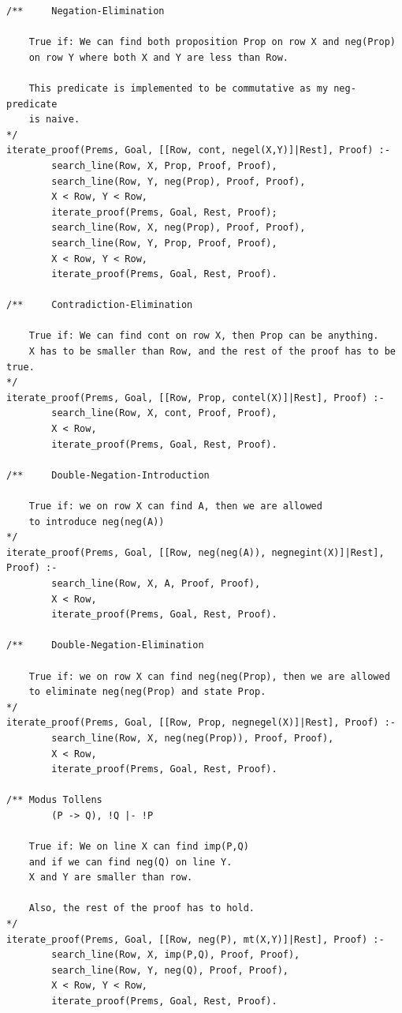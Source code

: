 \documentclass[a4paper]{article}
\begin{document}
\begin{verbatim}
/**     Negation-Elimination

	True if: We can find both proposition Prop on row X and neg(Prop)
	on row Y where both X and Y are less than Row.
	
	This predicate is implemented to be commutative as my neg-predicate
	is naive.
*/
iterate_proof(Prems, Goal, [[Row, cont, negel(X,Y)]|Rest], Proof) :-
        search_line(Row, X, Prop, Proof, Proof),
        search_line(Row, Y, neg(Prop), Proof, Proof),
        X < Row, Y < Row,
        iterate_proof(Prems, Goal, Rest, Proof);
        search_line(Row, X, neg(Prop), Proof, Proof),
        search_line(Row, Y, Prop, Proof, Proof),
        X < Row, Y < Row,
        iterate_proof(Prems, Goal, Rest, Proof).

/**     Contradiction-Elimination

	True if: We can find cont on row X, then Prop can be anything.
	X has to be smaller than Row, and the rest of the proof has to be true.
*/
iterate_proof(Prems, Goal, [[Row, Prop, contel(X)]|Rest], Proof) :-
        search_line(Row, X, cont, Proof, Proof),
        X < Row,
        iterate_proof(Prems, Goal, Rest, Proof).

/**     Double-Negation-Introduction

	True if: we on row X can find A, then we are allowed 
	to introduce neg(neg(A))
*/
iterate_proof(Prems, Goal, [[Row, neg(neg(A)), negnegint(X)]|Rest], Proof) :-
        search_line(Row, X, A, Proof, Proof),
        X < Row,
        iterate_proof(Prems, Goal, Rest, Proof).

/**     Double-Negation-Elimination

	True if: we on row X can find neg(neg(Prop), then we are allowed
	to eliminate neg(neg(Prop) and state Prop.
*/
iterate_proof(Prems, Goal, [[Row, Prop, negnegel(X)]|Rest], Proof) :-
        search_line(Row, X, neg(neg(Prop)), Proof, Proof),
        X < Row,
        iterate_proof(Prems, Goal, Rest, Proof).

/** Modus Tollens
        (P -> Q), !Q |- !P
        
	True if: We on line X can find imp(P,Q) 
	and if we can find neg(Q) on line Y.
	X and Y are smaller than row. 
     
	Also, the rest of the proof has to hold.    
*/
iterate_proof(Prems, Goal, [[Row, neg(P), mt(X,Y)]|Rest], Proof) :-
        search_line(Row, X, imp(P,Q), Proof, Proof),
        search_line(Row, Y, neg(Q), Proof, Proof),
        X < Row, Y < Row,
        iterate_proof(Prems, Goal, Rest, Proof).


\end{verbatim}
\end{document}
